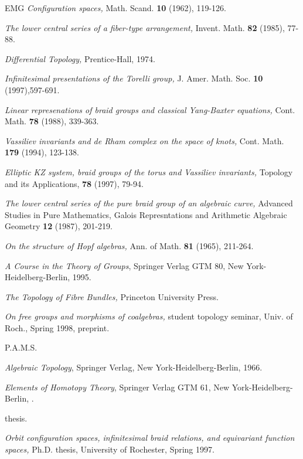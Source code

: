 \documentclass{amsart}
\begin{document}
\begin{thebibliography}{EMG}
\textit{Configuration spaces,} 
Math. Scand. {\bf 10} (1962), 119-126.

\textit{The lower
central series of a fiber-type arrangement,} 
Invent. Math. {\bf 82} (1985), 77-88.

\textit{Differential Topology,}
Prentice-Hall, 1974.


\textit{Infinitesimal presentations of the
Torelli group,} 
J. Amer. Math. Soc. {\bf 10} (1997),597-691.

\textit{Linear represenations of
braid groups and classical Yang-Baxter equations,} 
Cont. Math. {\bf 78} (1988), 339-363.

\textit{Vassiliev invariants and de Rham complex on the
space of knots,} 
Cont. Math. {\bf 179} (1994), 123-138.

\textit{Elliptic KZ system, braid groups of the
torus and Vassiliev invariants,} 
Topology and its Applications, {\bf 78} (1997), 79-94.

\textit{The lower central series of the pure
braid group of an algebraic curve,} 
Advanced Studies in Pure
Mathematics, Galois Represntations and Arithmetic Algebraic Geometry
{\bf 12} (1987), 201-219.

\textit{On the structure of Hopf algebras,} 
Ann. of Math. {\bf 81} (1965), 211-264.

\textit{A Course in the Theory of Groups}, Springer Verlag GTM 80,
New York-Heidelberg-Berlin, 1995.

\textit{The Topology of Fibre Bundles,}
Princeton University Press.

\textit{On free groups and
morphisms of coalgebras,} 
student topology seminar, Univ. of Roch.,
Spring 1998, preprint.

P.A.M.S.

\textit{Algebraic Topology}, Springer Verlag,
New York-Heidelberg-Berlin, 1966.

\textit{Elements of Homotopy Theory}, Springer Verlag GTM 61,
New York-Heidelberg-Berlin, .

 thesis.

\textit{Orbit configuration spaces, infinitesimal
braid relations, and equivariant function spaces,} 
Ph.D. thesis, University of Rochester, Spring 1997.


\end{thebibliography}
\end{document}
